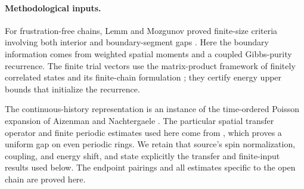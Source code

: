 \paragraph{Methodological inputs.}
For frustration-free chains, Lemm and Mozgunov proved finite-size
criteria involving both interior and boundary-segment gaps
\cite{LemmMozgunov2019}. Here the boundary information comes from
weighted spatial moments and a coupled Gibbs-purity recurrence.
The finite trial vectors use the matrix-product framework of finitely
correlated states \cite{FNW1992} and its finite-chain formulation
\cite{PerezGarcia2007}; they certify energy upper bounds that
initialize the recurrence.

The continuous-history representation is an instance of the
time-ordered Poisson expansion of Aizenman and Nachtergaele
\cite{AizenmanNachtergaele1994}. The particular spatial transfer
operator and finite periodic estimates used here come from
\cite{periodic}, which proves a uniform gap on even periodic rings.
We retain that source's spin normalization, coupling, and energy
shift, and state explicitly the transfer and finite-input results
used below. The endpoint pairings and all estimates specific to the
open chain are proved here.
